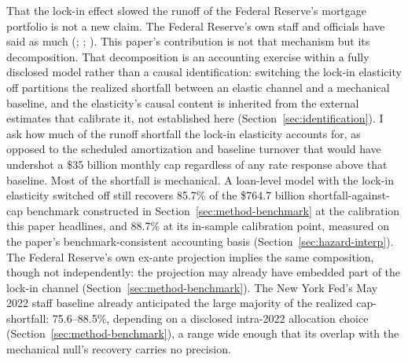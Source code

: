 \documentclass[12pt]{article}
\begin{document}
That the lock-in effect slowed the runoff of the Federal Reserve's mortgage portfolio is not a new claim. The Federal Reserve's own staff and officials have said as much (\citealp{na2024}; \citealp{perli2024}; \citealp{hammack2025}). This paper's contribution is not that mechanism but its decomposition. That decomposition is an accounting exercise within a fully disclosed model rather than a causal identification: switching the lock-in elasticity off partitions the realized shortfall between an elastic channel and a mechanical baseline, and the elasticity's causal content is inherited from the external estimates that calibrate it, not established here (Section~\ref{sec:identification}). I ask how much of the runoff shortfall the lock-in elasticity accounts for, as opposed to the scheduled amortization and baseline turnover that would have undershot a \$35 billion monthly cap regardless of any rate response above that baseline. Most of the shortfall is mechanical. A loan-level model with the lock-in elasticity switched off still recovers 85.7\% of the \$764.7 billion shortfall-against-cap benchmark constructed in Section~\ref{sec:method-benchmark} at the calibration this paper headlines, and 88.7\% at its in-sample calibration point, measured on the paper's benchmark-consistent accounting basis (Section~\ref{sec:hazard-interp}). The Federal Reserve's own ex-ante projection implies the same composition, though not independently: the projection may already have embedded part of the lock-in channel (Section~\ref{sec:method-benchmark}). The New York Fed's May 2022 staff baseline already anticipated the large majority of the realized cap-shortfall: 75.6--88.5\%, depending on a disclosed intra-2022 allocation choice (Section~\ref{sec:method-benchmark}), a range wide enough that its overlap with the mechanical null's recovery carries no precision.
\end{document}

